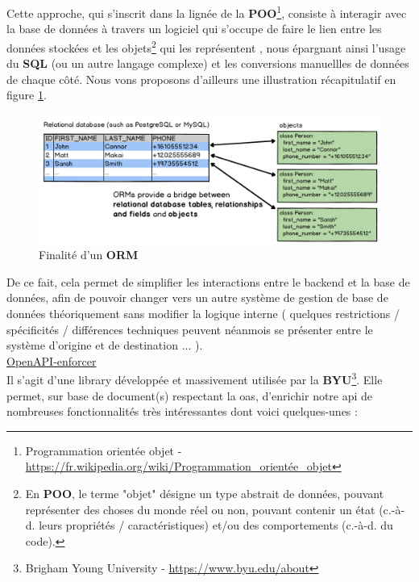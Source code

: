 Cette approche, qui s'inscrit dans la lignée de la \textbf{POO}\footnote{
    Programmation orientée objet -
    \href{https://fr.wikipedia.org/wiki/Programmation\_orient\%C3\%A9e\_objet}{https://fr.wikipedia.org/wiki/Programmation\_orientée\_objet}
}, consiste à interagir avec la base de données à travers un logiciel qui s'occupe de faire le lien entre les données stockées et les objets\footnote{
    En \textbf{POO}, le terme "objet" désigne un type abstrait de données, pouvant représenter des choses du monde réel ou non, pouvant contenir un état (c.-à-d. leurs propriétés / caractéristiques) et/ou des comportements (c.-à-d. du code).
} qui les représentent
, nous épargnant ainsi l'usage du \textbf{SQL} (ou un autre langage complexe) et les conversions manuellles de données de chaque côté. 
Nous vons proposons d'ailleurs une illustration récapitulatif en figure \ref{fig:ORMExplanations}.

\begin{figure}[H]
    \includegraphics[width=\textwidth,height=\textheight,keepaspectratio]{images/libraries/orms-bridge.png}
    \centering
    \caption[Finalité d'un \textbf{ORM}]{Finalité d'un \textbf{ORM}}
    \label{fig:ORMExplanations}
\end{figure}

De ce fait, cela permet de simplifier les interactions entre le \gls{backend} et la base de données, afin de pouvoir changer vers un autre système de gestion de base de données théoriquement sans modifier la logique interne (
    quelques restrictions / spécificités / différences techniques peuvent néanmois se présenter entre le système d'origine et de destination ...
). \\

\noindent\underline{OpenAPI-enforcer}\\

Il s'agit d'une \gls{library} développée et massivement utilisée par la \textbf{BYU}\footnote{
    Brigham Young University - \url{https://www.byu.edu/about}
}. 
Elle permet, sur base de document(s) respectant la \Gls{oas}, d'enrichir notre \Gls{api} de nombreuses fonctionnalités très intéressantes dont voici quelques-unes :

